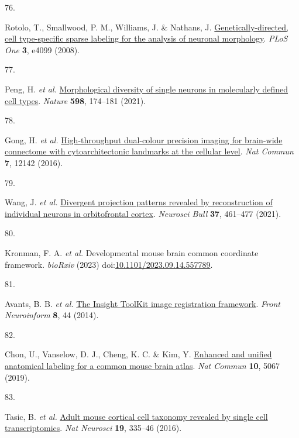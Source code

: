 \documentclass[
  12pt,
]{article}
\newlength{\cslhangindent}
\newlength{\csllabelwidth}
\newenvironment{CSLReferences}[2] %
 {\begin{list}{}{%
  \setlength{\itemindent}{0pt}
  \setlength{\leftmargin}{0pt}
  \setlength{\parsep}{0pt}
  \ifodd #1
   \setlength{\leftmargin}{\cslhangindent}
   \setlength{\itemindent}{-1\cslhangindent}
  \fi
  \setlength{\itemsep}{#2\baselineskip}}}
 {\end{list}}
\newcommand{\CSLLeftMargin}[1]{\parbox[t]{\csllabelwidth}{\strut#1\strut}}
\newcommand{\CSLRightInline}[1]{\parbox[t]{\linewidth - \csllabelwidth}{\strut#1\strut}}
\begin{document}
\begin{CSLReferences}{0}{0}
\CSLLeftMargin{76. }%
\CSLRightInline{Rotolo, T., Smallwood, P. M., Williams, J. \& Nathans,
J.
\href{https://doi.org/10.1371/journal.pone.0004099}{Genetically-directed,
cell type-specific sparse labeling for the analysis of neuronal
morphology}. \emph{PLoS One} \textbf{3}, e4099 (2008).}

\CSLLeftMargin{77. }%
\CSLRightInline{Peng, H. \emph{et al.}
\href{https://doi.org/10.1038/s41586-021-03941-1}{Morphological
diversity of single neurons in molecularly defined cell types}.
\emph{Nature} \textbf{598}, 174--181 (2021).}

\CSLLeftMargin{78. }%
\CSLRightInline{Gong, H. \emph{et al.}
\href{https://doi.org/10.1038/ncomms12142}{High-throughput dual-colour
precision imaging for brain-wide connectome with cytoarchitectonic
landmarks at the cellular level}. \emph{Nat Commun} \textbf{7}, 12142
(2016).}

\CSLLeftMargin{79. }%
\CSLRightInline{Wang, J. \emph{et al.}
\href{https://doi.org/10.1007/s12264-020-00616-1}{Divergent projection
patterns revealed by reconstruction of individual neurons in
orbitofrontal cortex}. \emph{Neurosci Bull} \textbf{37}, 461--477
(2021).}

\CSLLeftMargin{80. }%
\CSLRightInline{Kronman, F. A. \emph{et al.} Developmental mouse brain
common coordinate framework. \emph{bioRxiv} (2023)
doi:\href{https://doi.org/10.1101/2023.09.14.557789}{10.1101/2023.09.14.557789}.}

\CSLLeftMargin{81. }%
\CSLRightInline{Avants, B. B. \emph{et al.}
\href{https://doi.org/10.3389/fninf.2014.00044}{The {Insight} {ToolKit}
image registration framework}. \emph{Front Neuroinform} \textbf{8}, 44
(2014).}

\CSLLeftMargin{82. }%
\CSLRightInline{Chon, U., Vanselow, D. J., Cheng, K. C. \& Kim, Y.
\href{https://doi.org/10.1038/s41467-019-13057-w}{Enhanced and unified
anatomical labeling for a common mouse brain atlas}. \emph{Nat Commun}
\textbf{10}, 5067 (2019).}

\CSLLeftMargin{83. }%
\CSLRightInline{Tasic, B. \emph{et al.}
\href{https://doi.org/10.1038/nn.4216}{Adult mouse cortical cell
taxonomy revealed by single cell transcriptomics}. \emph{Nat Neurosci}
\textbf{19}, 335--46 (2016).}


\end{CSLReferences}
\end{document}
